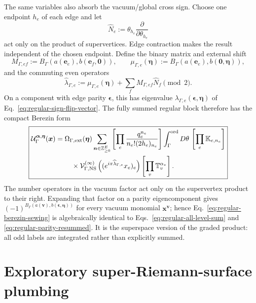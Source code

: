 \documentclass[11pt]{article}
\newcommand{\NS}{\mathrm{NS}}
\newcommand{\V}{\mathcal V}
\newcommand{\U}{\mathcal U}
\begin{document}
The same variables also absorb the vacuum/global cross sign.  Choose one
endpoint \(h_e\) of each edge and let
\begin{equation}
 \widehat N_e:=\theta_{h_e}\frac{\partial}{\partial\theta_{h_e}}
 \label{eq:edge-fermion-number-operator}
\end{equation}
act only on the product of supervertices.  Edge contraction makes the result
independent of the chosen endpoint.  Define the binary matrix and external
shift
\begin{equation}
 M_{\Gamma,ef}
 :=B_\Gamma(a(\bm e_e),b(\bm e_f,\bm0)),
 \qquad
 \mu_{\Gamma,e}(\bm\eta)
 :=B_\Gamma(a(\bm e_e),b(\bm0,\bm\eta)),
 \label{eq:berezin-cross-sign-matrix}
\end{equation}
and the commuting even operators
\begin{equation}
 \widehat\lambda_{\Gamma,e}
 :=\mu_{\Gamma,e}(\bm\eta)
   +\sum_f M_{\Gamma,ef}\widehat N_f\pmod2.
 \label{eq:berezin-sign-flip-operator}
\end{equation}
On a component with edge parity \(\bm\epsilon\), this has eigenvalue
\(\lambda_{\Gamma,e}(\bm\epsilon,\bm\eta)\) of
Eq.~\eqref{eq:regular-sign-flip-vector}.  The fully summed regular block
therefore has the compact Berezin form
\begin{equation}
\boxed{
\begin{aligned}
 \U_\Gamma^{\bm\alpha,\bm\eta}(\bm x)
 ={}&\Omega_{\Gamma,{\rm ext}}(\bm\eta)
 \sum_{\bm n\in\mathbb Z_{\ge0}^{E}}
 \left[\prod_e\frac{q_e^{n_e}}
 {n_e!(2h_e)_{n_e}}\right]
 \int_\Gamma^{\rm ord}D\theta\,
 \left[\prod_e\mathbb K_{e,n_e}\right]
 \\
 &\quad\times
 \V_{\Gamma,\NS}^{(\infty)}
 \left((e^{i\pi\widehat\lambda_{\Gamma,e}}x_e)_e\right)
 \left[\prod_v\mathbb T_v^{\alpha_v}\right].
\end{aligned}}
 \label{eq:regular-berezin-sewing}
\end{equation}
The number operators in the vacuum factor act only on the supervertex product
to their right.  Expanding that factor on a parity eigencomponent gives
\((-1)^{B_\Gamma(a(\bm v),b(\bm\epsilon,\bm\eta))}\) for every vacuum
monomial \(\bm x^{\bm v}\); hence
Eq.~\eqref{eq:regular-berezin-sewing} is algebraically identical to
Eqs.~\eqref{eq:regular-all-level-sum} and
\eqref{eq:regular-parity-resummed}.  It is the superspace version of the
graded product: all odd labels are integrated rather than explicitly summed.


\section{Exploratory super-Riemann-surface plumbing}
\label{sec:exploratory-super-plumbing}
\end{document}
